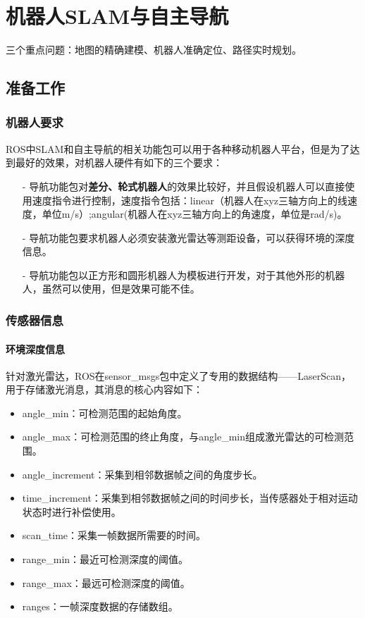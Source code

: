 \documentclass[10pt, oneside]{book}
\begin{document}
\chapter{机器人SLAM与自主导航}

三个重点问题：地图的精确建模、机器人准确定位、路径实时规划。

\section{准备工作}

\subsection{机器人要求}

ROS中SLAM和自主导航的相关功能包可以用于各种移动机器人平台，但是为了达到最好的效果，对机器人硬件有如下的三个要求：

\begin{itemize}
    \item[-] 导航功能包对\textbf{差分、轮式机器人}的效果比较好，并且假设机器人可以直接使用速度指令进行控制，速度指令包括：linear（机器人在xyz三轴方向上的线速度，单位m/s）;angular(机器人在xyz三轴方向上的角速度，单位是rad/s)。
    \item[-] 导航功能包要求机器人必须安装激光雷达等测距设备，可以获得环境的深度信息。
    \item[-] 导航功能包以正方形和圆形机器人为模板进行开发，对于其他外形的机器人，虽然可以使用，但是效果可能不佳。
\end{itemize}

\subsection{传感器信息}

\subsubsection{环境深度信息}

针对激光雷达，ROS在sensor\_msgs包中定义了专用的数据结构——LaserScan，用于存储激光消息，其消息的核心内容如下：

\begin{itemize}
    \item angle\_min：可检测范围的起始角度。
    \item angle\_max：可检测范围的终止角度，与angle\_min组成激光雷达的可检测范围。
    \item angle\_increment：采集到相邻数据帧之间的角度步长。
    \item time\_increment：采集到相邻数据帧之间的时间步长，\textcolor[rgb]{1,0,0}{当传感器处于相对运动状态时进行补偿使用。}
    \item scan\_time：采集一帧数据所需要的时间。
    \item range\_min：最近可检测深度的阈值。
    \item range\_max：最远可检测深度的阈值。
    \item ranges：一帧深度数据的存储数组。
\end{itemize}
\end{document}
